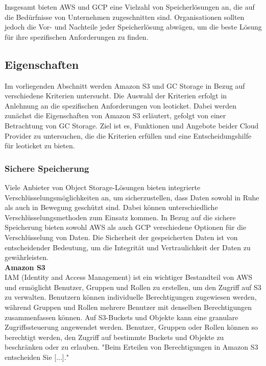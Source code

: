 Insgesamt bieten AWS und GCP eine Vielzahl von Speicherlösungen an, die auf die Bedürfnisse von Unternehmen zugeschnitten sind. Organisationen sollten jedoch die Vor- und Nachteile jeder Speicherlösung abwägen, um die beste Lösung für ihre spezifischen Anforderungen zu finden.

\newpage

\subsection{Eigenschaften}

Im vorliegenden Abschnitt werden Amazon S3 und GC Storage in Bezug auf verschiedene Kriterien untersucht. Die Auswahl der Kriterien erfolgt in Anlehnung an die spezifischen Anforderungen von leoticket. Dabei werden zunächst die Eigenschaften von Amazon S3 erläutert, gefolgt von einer Betrachtung von GC Storage. Ziel ist es, Funktionen und Angebote beider Cloud Provider zu untersuchen, die die Kriterien erfüllen und eine Entscheidungshilfe für leoticket zu bieten. 

\newpage

\subsubsection{Sichere Speicherung}

Viele Anbieter von Object Storage-Lösungen bieten integrierte Verschlüsselungsmöglichkeiten an, um sicherzustellen, dass Daten sowohl in Ruhe als auch in Bewegung geschützt sind. Dabei können unterschiedliche Verschlüsselungsmethoden zum Einsatz kommen. In Bezug auf die sichere Speicherung bieten sowohl AWS als auch GCP verschiedene Optionen für die Verschlüsselung von Daten. Die Sicherheit der gespeicherten Daten ist von entscheidender Bedeutung, um die Integrität und Vertraulichkeit der Daten zu gewährleisten.\\

\textbf{Amazon S3}\\

IAM (Identity and Access Management) ist ein wichtiger Bestandteil von AWS und ermöglicht Benutzer, Gruppen und Rollen zu erstellen, um den Zugriff auf S3 zu verwalten. Benutzern können individuelle Berechtigungen zugewiesen werden, während Gruppen und Rollen mehrere Benutzer mit denselben Berechtigungen zusammenfassen können. Auf S3-Buckets und Objekte kann eine granulare Zugriffssteuerung angewendet werden. Benutzer, Gruppen oder Rollen können so berechtigt werden, den Zugriff auf bestimmte Buckets und Objekte zu beschränken oder zu erlauben. "Beim Erteilen von Berechtigungen in Amazon S3 entscheiden Sie [...]."\cite{aws-iam-s3}\\

